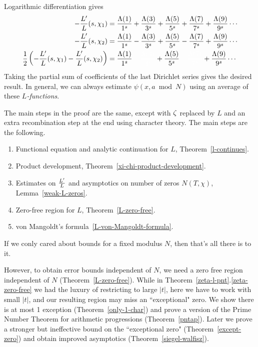 Logarithmic differentiation gives
\begin{align*}
-\fc{L'}{L}(s,\chi_1)&=\frac{\La(1)}{1^s}+\frac{\La(3)}{3^s}+\frac{\La(5)}{5^s}+\frac{\La(7)}{7^s}+\frac{\La(9)}{9^s}\cdots\\
-\fc{L'}{L}(s,\chi_2)&=\frac{\La(1)}{1^s}-\frac{\La(3)}{3^s}+\frac{\La(5)}{5^s}-\frac{\La(7)}{7^s}+\frac{\La(9)}{9^s}\cdots\\
\rc2\pa{-\fc{L'}{L}(s,\chi_1)
-\fc{L'}{L}(s,\chi_2)}
&=\frac{\La(1)}{1^s}
{\color{white} \,+\, \frac{\La(3)}{3^s}}
+\frac{\La(5)}{5^s}
{\color{white} \,+\, \frac{\La(7)}{7^s}}
+ \frac{\La(9)}{9^s}\cdots
\end{align*}
Taking the partial sum of coefficients of the last Dirichlet series gives the desired result. 
In general, we can always estimate $\psi(x, a\bmod N)$ using an average of these {\it $L$-functions}.%

The main steps in the proof are the same, except with $\zeta$ replaced by $L$ and an extra recombination step at the end using character theory. The main steps are the following.
\begin{enumerate}
\item Functional equation and analytic continuation for $L$, Theorem~\ref{l-continues}.
\item Product development, Theorem~\ref{xi-chi-product-development}.
\item Estimates on $\frac{L'}{L}$ and asymptotics on number of zeros $N(T,\chi)$, Lemma~\ref{weak-L-zeros}.
\item Zero-free region for $L$, Theorem~\ref{L-zero-free}.
\item von Mangoldt's formula~\ref{L-von-Mangoldt-formula}.
\end{enumerate}
If we conly cared about bounds for a fixed modulus $N$, then that's all there is to it.

However, to obtain error bounds independent of $N$, we need a zero free region independent of $N$ (Theorem~\ref{L-zero-free}). While in Theorem~\ref{zeta-l-pnt}.\ref{zeta-zero-free} we had the luxury of restricting to large $|t|$, here we have to work with small $|t|$, and our resulting region may miss an ``exceptional" zero. We show there is at most 1 exception (Theorem~\ref{only-1-char}) and prove a version of the Prime Number Theorem for arithmetic progressions (Theorem~\ref{pntap}). Later we prove a stronger but ineffective bound on the ``exceptional zero" (Theorem~\ref{except-zero}) and obtain improved asymptotics (Theorem~\ref{siegel-walfisz}).

